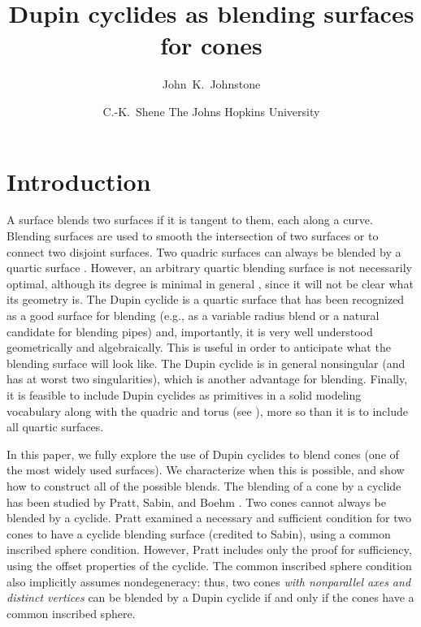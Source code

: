 
\newtheorem{remark}{Remark}[section]
\newtheorem{cor}{Corollary}[section]
\newcommand{\QED}{\vrule height 1.4ex width 1.0ex depth -.1ex\ } %



\title{
Dupin cyclides as blending surfaces for cones
}

\author{
John~K.~Johnstone \and C.-K.~Shene
\affil The Johns Hopkins University
}




\maketitle

\section{Introduction}

A surface blends two surfaces if it is tangent to them, each along a curve.
Blending surfaces are used to smooth the intersection of two surfaces
or to connect two disjoint surfaces.
Two quadric surfaces can always be blended by a quartic 
surface \cite{hoffmann-hopcroft:1986,hoffmann-hopcroft:1987}.
However, an arbitrary quartic blending surface is not necessarily optimal,
although its degree is minimal in general \cite{hoffmann-hopcroft:1986}, 
since it will not be clear what its geometry is.
The Dupin cyclide is a quartic surface that has been recognized as a
good surface for blending 
\cite{boehm:1990,chandru-dutta-hoffmann:1990,dutta:1989,pratt:1989,pratt:1990} 
(e.g., as a variable radius blend or a natural candidate for blending pipes)
and, importantly, it is 
very well understood geometrically and algebraically.
This is useful in order to anticipate what the blending surface will 
look like.
The Dupin cyclide is in general nonsingular (and has at worst two
singularities), which is another advantage for blending.
Finally, it is feasible to include Dupin cyclides 
as primitives in a solid modeling vocabulary 
along with the quadric and torus (see \cite{jj92}),
more so than it is to include all quartic surfaces.

In this paper, we fully explore the use of Dupin cyclides to blend cones
(one of the most widely used surfaces).
We characterize when this is possible, and show how to construct all of the
possible blends.
The blending of a cone 
by a cyclide has been studied by Pratt, Sabin, and Boehm
\cite{pratt:1989,pratt:1990,boehm:1990}.
Two cones cannot always be blended by a cyclide.
Pratt \cite{pratt:1990} 
examined a necessary and sufficient condition for two cones
to have a cyclide blending surface (credited to Sabin), 
using a common inscribed sphere condition.
However, Pratt includes only the proof for sufficiency, using the offset 
properties of the cyclide.
The common inscribed sphere condition also implicitly assumes nondegeneracy:
thus, two cones {\em with nonparallel axes and distinct
vertices} can be blended by a Dupin cyclide if and only if
the cones have a common inscribed sphere.

